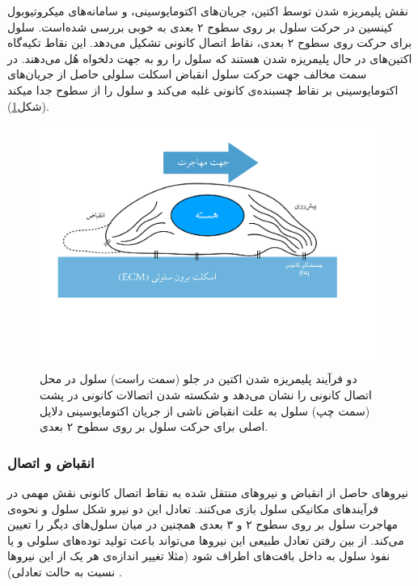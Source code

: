 نقش پلیمریزه شدن توسط اکتین، جریان‌های اکتومایوسینی، و سامانه‌های میکروتیوبول کینسین در حرکت سلول بر روی سطوح ۲ بعدی به خوبی بررسی شده‌است\cite{PhysRevLett.92.078101, refId0, PhysRevE.76.031921}. سلول برای حرکت روی سطوح ۲ بعدی، نقاط اتصال کانونی تشکیل می‌دهد. این نقاط تکیه‌گاه اکتین‌های در حال پلیمریزه شدن هستند که سلول را رو به جهت دلخواه هُل می‌دهند. در سمت مخالف جهت حرکت سلول انقباض اسکلت سلولی حاصل از جریان‌های اکتومایوسینی بر نقاط چسبنده‌ی کانونی غلبه می‌کند و سلول را از سطوح جدا میکند\cite{Hawkins:2011eu} (شکل\ref{fig:migration}).
\begin{figure}[htbp]
\begin{center}
\includegraphics[width=5in]{Figs/cell_sketch}
\caption{
دو فرآیند پلیمریزه‌ شدن اکتین در جلو (سمت راست) سلول در محل اتصال کانونی را نشان می‌دهد و شکسته شدن اتصالات کانونی در پشت (سمت چپ) سلول به علت انقباض ناشی از جریان اکتومایوسینی دلایل اصلی برای حرکت سلول بر روی سطوح ۲ بعدی.
}
\label{fig:migration}
\end{center}
\end{figure}


\subsubsection{انقباض و اتصال}\label{lab:traction}
نیروهای حاصل از انقباض و نیروهای منتقل شده به نقاط اتصال کانونی نقش مهمی در فرآیندهای مکانیکی سلول بازی می‌کنند. تعادل این دو نیرو شکل سلول و نحوه‌ی مهاجرت سلول بر روی سطوح ۲ و ۳ بعدی همچنین در میان سلول‌های دیگر را تعیین می‌کند. از بین رفتن تعادل طبیعی این نیروها می‌تواند باعث تولید توده‌های سلولی و یا نفوذ سلول به داخل بافت‌های اطراف شود (مثلا تغییر اندازه‌ی هر یک از این نیروها نسبت به حالت تعادلی)  \cite{doi:10.1080/19336918.2015.1008329}.






